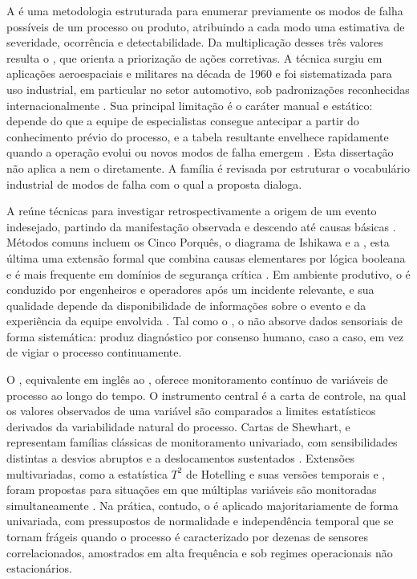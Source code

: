 A  é uma metodologia estruturada para enumerar previamente os modos de falha possíveis de um processo ou produto, atribuindo a cada modo uma estimativa de severidade, ocorrência e detectabilidade. Da multiplicação desses três valores resulta o , que orienta a priorização de ações corretivas. A técnica surgiu em aplicações aeroespaciais e militares na década de 1960 e foi sistematizada para uso industrial, em particular no setor automotivo, sob padronizações reconhecidas internacionalmente \cite{aiagvda2019fmea,stamatis2003fmea}. Sua principal limitação é o caráter manual e estático: depende do que a equipe de especialistas consegue antecipar a partir do conhecimento prévio do processo, e a tabela resultante envelhece rapidamente quando a operação evolui ou novos modos de falha emergem \cite{stamatis2003fmea}. Esta dissertação não aplica a  nem o  diretamente. A família é revisada por estruturar o vocabulário industrial de modos de falha com o qual a proposta dialoga.

A  reúne técnicas para investigar retrospectivamente a origem de um evento indesejado, partindo da manifestação observada e descendo até causas básicas \cite{mobley1999rootcause,doggett2005rootcause}. Métodos comuns incluem os Cinco Porquês, o diagrama de Ishikawa e a , esta última uma extensão formal que combina causas elementares por lógica booleana e é mais frequente em domínios de segurança crítica \cite{vesely1981faulttree,ericson1999faulttree}. Em ambiente produtivo, o  é conduzido por engenheiros e operadores após um incidente relevante, e sua qualidade depende da disponibilidade de informações sobre o evento e da experiência da equipe envolvida \cite{mobley1999rootcause}. Tal como o , o  não absorve dados sensoriais de forma sistemática: produz diagnóstico por consenso humano, caso a caso, em vez de vigiar o processo continuamente.

O , equivalente em inglês ao , oferece monitoramento contínuo de variáveis de processo ao longo do tempo. O instrumento central é a carta de controle, na qual os valores observados de uma variável são comparados a limites estatísticos derivados da variabilidade natural do processo. Cartas de Shewhart,  e  representam famílias clássicas de monitoramento univariado, com sensibilidades distintas a desvios abruptos e a deslocamentos sustentados \cite{montgomery2019statistical}. Extensões multivariadas, como a estatística $T^2$ de Hotelling e suas versões temporais  e , foram propostas para situações em que múltiplas variáveis são monitoradas simultaneamente \cite{hotelling1947multivariate,lowry1992multivariate}. Na prática, contudo, o  é aplicado majoritariamente de forma univariada, com pressupostos de normalidade e independência temporal que se tornam frágeis quando o processo é caracterizado por dezenas de sensores correlacionados, amostrados em alta frequência e sob regimes operacionais não estacionários.


